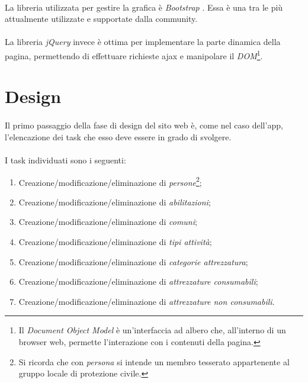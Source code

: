 \documentclass[12pt,a4paper,twoside,english,italian]{book}
\begin{document}
\paragraph{} La libreria utilizzata per gestire la grafica è \emph{Bootstrap} \cite{bootstrap}. Essa è una tra le più attualmente utilizzate e supportate dalla community.

\paragraph{} La libreria \emph{jQuery} \cite{jquery} invece è ottima per implementare la parte dinamica della pagina, permettendo di effettuare richieste ajax e manipolare il \emph{DOM}\footnote{Il \emph{Document Object Model} è un'interfaccia ad albero che, all'interno di un browser web, permette l'interazione con i contenuti della pagina.}.


\section{Design}

\paragraph{} Il primo passaggio della fase di design del sito web è, come nel caso dell'app, l'elencazione dei task che esso deve essere in grado di svolgere. 

\paragraph{} I task individuati sono i seguenti:
\begin{enumerate}
    \item Creazione/modificazione/eliminazione di \emph{persone}\footnote{Si ricorda che con \emph{persona} si intende un membro tesserato appartenente al gruppo locale di protezione civile.};
    \item Creazione/modificazione/eliminazione di \emph{abilitazioni};
    \item Creazione/modificazione/eliminazione di \emph{comuni};
    \item Creazione/modificazione/eliminazione di \emph{tipi attività};
    \item Creazione/modificazione/eliminazione di \emph{categorie attrezzatura};
    \item Creazione/modificazione/eliminazione di \emph{attrezzature consumabili};
    \item Creazione/modificazione/eliminazione di \emph{attrezzature non consumabili}.
\end{enumerate}
\end{document}
